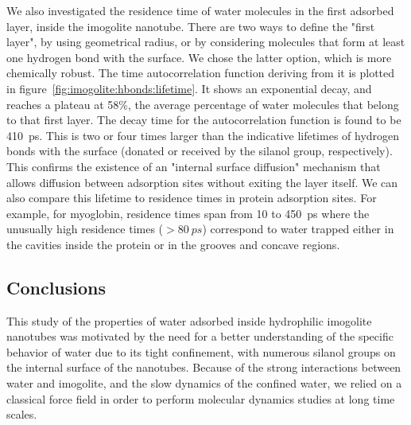 \documentclass[thesis]{subfiles}
\begin{document}
We also investigated the residence time of water molecules in the first adsorbed
layer, inside the imogolite nanotube. There are two ways to define the "first
layer", by using geometrical radius, or by considering molecules that form at
least one hydrogen bond with the surface. We chose the latter option, which is
more chemically robust. The time autocorrelation function deriving from it is
plotted in figure~\ref{fig:imogolite:hbonds:lifetime}. It shows an exponential
decay, and reaches a plateau at 58\%, \ie the average percentage of water
molecules that belong to that first layer. The decay time for the
autocorrelation function is found to be \SI{410}{ps}. This is two or four times
larger than the indicative lifetimes of hydrogen bonds with the surface (donated
or received by the silanol group, respectively). This confirms the existence of
an "internal surface diffusion" mechanism that allows diffusion between adsorption
sites without exiting the layer itself. We can also compare this lifetime to
residence times in protein adsorption sites. For example, for
myoglobin\cite{Makarov2000}, residence times span from 10 to \SI{450}{ps} where
the unusually high residence times ($> \SI{80}{ps}$) correspond to water trapped
either in the cavities inside the protein or in the grooves and concave regions.

\subsection*{Conclusions}

This study of the properties of water adsorbed inside hydrophilic imogolite
nanotubes was motivated by the need for a better understanding of the specific
behavior of water due to its tight confinement, with numerous silanol groups on
the internal surface of the nanotubes. Because of the strong interactions
between water and imogolite, and the slow dynamics of the confined water, we
relied on a classical force field in order to perform molecular dynamics
studies at long time scales.
\end{document}
